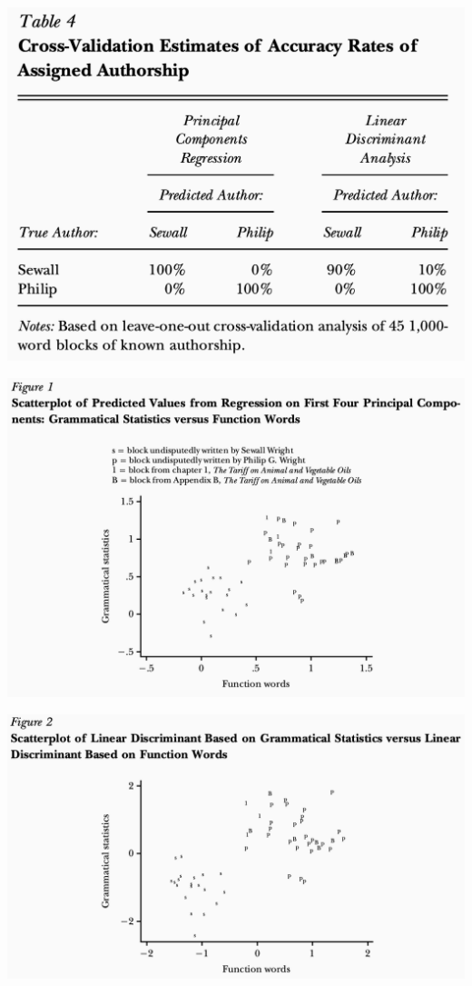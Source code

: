 \documentclass[english]{beamer}
\begin{document}
\begin{frame}{}
\centering
\includegraphics[width=0.9 \textwidth]{Images/fischer_table4.png}
\end{frame}

\begin{frame}{}
\centering
\includegraphics[width=1 \textwidth]{Images/fischer_figure1.png}
\end{frame}

\begin{frame}{}
\centering
\includegraphics[width=1 \textwidth]{Images/fischer_figure2.png}
\end{frame}
\end{document}

